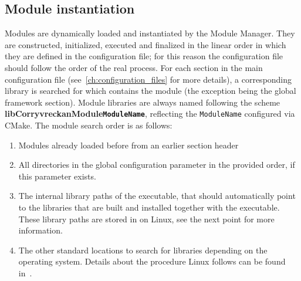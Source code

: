 \subsection{Module instantiation}
\label{sec:module_instantiation}
Modules are dynamically loaded and instantiated by the Module Manager.
They are constructed, initialized, executed and finalized in the linear order in which they are defined in the configuration file; for this reason the configuration file should follow the order of the real process.
For each section in the main configuration file (see~\ref{ch:configuration_files} for more details), a corresponding library is searched for which contains the module (the exception being the global framework section).
Module libraries are always named following the scheme \textbf{libCorryvreckanModule\texttt{ModuleName}}, reflecting the \texttt{ModuleName} configured via CMake.
The module search order is as follows:
\begin{enumerate}
\item Modules already loaded before from an earlier section header
\item All directories in the global configuration parameter  in the provided order, if this parameter exists.
\item The internal library paths of the executable, that should automatically point to the libraries that are built and installed together with the executable.
These library paths are stored in  on Linux, see the next point for more information.
\item The other standard locations to search for libraries depending on the operating system.
Details about the procedure Linux follows can be found in~\cite{linuxld}.
\end{enumerate}

